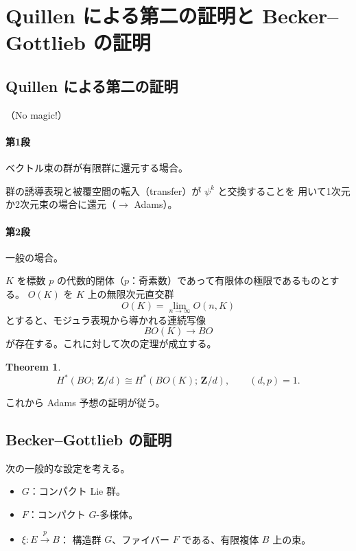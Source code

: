 \documentclass[uplatex,dvipdfmx,a4paper,12pt]{jlreq}
\newtheorem{theorem}{Theorem}
\newcommand{\Z}{\mathbf{Z}}
\begin{document}
\section{Quillen による第二の証明と Becker--Gottlieb の証明}

\subsection{Quillen による第二の証明}

\cite{Q71}（No magic!）

\paragraph{第1段} ベクトル束の群が有限群に還元する場合。

群の誘導表現と被覆空間の転入（transfer）が $\psi^k$ と交換することを
用いて1次元か2次元束の場合に還元（$\longrightarrow$ Adams）。

\paragraph{第2段} 一般の場合。

$K$ を標数 $p$ の代数的閉体（$p$：奇素数）であって有限体の極限であるものとする。
$O(K)$ を $K$ 上の無限次元直交群
\[
  O(K) = \lim_{n \to \infty} O(n, K)
\]
とすると、モジュラ表現から導かれる連続写像
\[
  BO(K) \longrightarrow BO
\]
が存在する。これに対して次の定理が成立する。

\begin{theorem}
  \[
    H^*(BO;\, \Z/d) \cong H^*(BO(K);\, \Z/d), \qquad (d, p) = 1.
  \]
\end{theorem}

これから Adams 予想の証明が従う。

\subsection{Becker--Gottlieb の証明}

\cite{BG75}

次の一般的な設定を考える。
\begin{itemize}
  \item $G$：コンパクト Lie 群。
  \item $F$：コンパクト $G$-多様体。
  \item $\xi : E \stackrel{p}{\longrightarrow} B$：
        構造群 $G$、ファイバー $F$ である、有限複体 $B$ 上の束。
\end{itemize}
\end{document}
